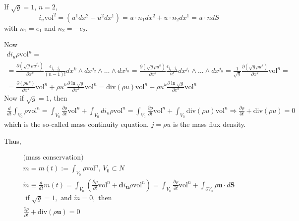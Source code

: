 \documentclass[10pt]{amsart}
\begin{document}
\begin{multicols*}{2}
If $\sqrt{g} = 1$, $n=2$, 
\[
i_u \text{vol}^2 = (u^1 dx^2 - u^2 dx^1) = u\cdot n_1 dx^2 + u\cdot n_2 dx^1 = u\cdot n dS
\]
with $n_1 =e_1$ and $n_2=-e_2$.  

Now 
\[
\begin{gathered}
di_u \rho \text{vol}^n = \\
= \frac{ \partial ( \sqrt{g} \rho u^{j_1} ) }{ \partial x^k} \frac{ \epsilon_{j_1 \dots j_n} }{ (n-1)! } dx^k \wedge dx^{j_2} \wedge \dots \wedge dx^{j_n} = \frac{ \partial (\sqrt{ g} \rho u^k) }{ \partial x^k} \frac{ \epsilon_{j_1 \dots j_n }}{ n!} dx^{j_1} \wedge \dots \wedge dx^{j_n} = \frac{1}{\sqrt{g}} \frac{ \partial (\sqrt{g} \rho u^k)}{ \partial x^k} \text{vol}^n = \\
= \frac{ \partial (\rho u^k)}{ \partial x^k} \text{vol}^n + \rho u^k \frac{ \partial \ln{ \sqrt{g}}}{ \partial x^k} \text{vol}^n = \text{div}(\rho u) \text{vol}^n + \rho u^k \frac{ \partial \ln{ \sqrt{g}}}{ \partial x^k} \text{vol}^n
\end{gathered}
\]
Now if $\sqrt{g}=1$, then 
\[
\begin{gathered}
\frac{d}{dt} \int_{V_0} \rho \text{vol}^n = \int_{V_0} \frac{ \partial \rho }{ \partial t} \text{vol}^n + \int_{V_0} di_u \rho \text{vol}^n = \int_{V_0} \frac{ \partial \rho }{ \partial t} \text{vol}^n + \int_{V_0} \text{div}(\rho u) \text{vol}^n \Longrightarrow \frac{ \partial \rho}{\partial t} + \text{div}(\rho u) = 0
\end{gathered}
\]
which is the so-called mass continuity equation.  $ j = \rho u$ is the mass flux density.  

Thus,

\begin{equation}\label{Eq:MassConservationForContinuum}
\begin{gathered}
\text{(mass conservation)} \\
m = m(t) := \int_{V_0} \rho \text{vol}^n, \, V_0 \subset N \\
\dot{m} \equiv \frac{d}{dt}m(t) = \int_{V_0} \left( \frac{\partial \rho }{ \partial t} \text{vol}^n + \mathbf{d}i_{\mathbf{u}} \rho \text{vol}^n \right) = \boxed{ \int_{V_0} \frac{ \partial \rho }{ \partial t} \text{vol}^n + \int_{\partial V_0} \rho \mathbf{u} \cdot d\mathbf{S} } \\
\text{ if } \sqrt{g} = 1, \text{ and } \dot{m} = 0, \text{ then } \\
\frac{\partial \rho }{ \partial t} + \text{div}(\rho \mathbf{u}) = 0 
\end{gathered}
\end{equation}


\end{multicols*}
\end{document}
